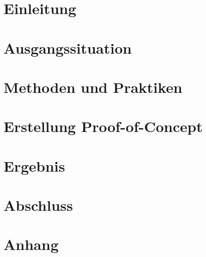 \documentclass[oneside, ngerman, final, 11pt, a4paper, 1.1headlines, headinclude=false, footinclude=false, mpinclude=false, pagesize, onecolumn, titlepage, parskip=half, headsepline, chapterprefix=false, version=first, listof=totoc, bibliography=totoc, toc=graduated, fleqn, twoside=false]{scrbook}
\begin{document}
	\newpage{}
	
	\newpage{}
	
	\setcounter{page}{1}
	
	\tableofcontents{}
	
	\newpage{}
	
	\setcounter{page}{1} 
	
	\chapter{Einleitung}
	
	
	\chapter{Ausgangssituation}
	
	
	\chapter{Methoden und Praktiken}
	\label{chap:methoden-und-praktiken}
	
	
	\chapter{Erstellung Proof-of-Concept}
	
	
	\chapter{Ergebnis}
	
	
	\chapter{Abschluss}
	
	
	\newpage{}
	
	\chapter{Anhang}
	
	
	\clearpage
	
	\let\cleardoublepage\relax
	
\end{document}
